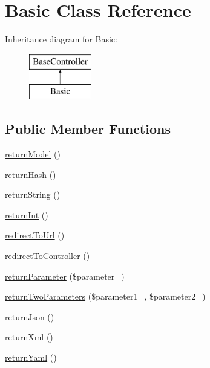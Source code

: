 \hypertarget{class_basic}{}\section{Basic Class Reference}
\label{class_basic}
Inheritance diagram for Basic\+:\begin{figure}[H]
\begin{center}
\leavevmode
\includegraphics[height=2.000000cm]{class_basic}
\end{center}
\end{figure}
\subsection*{Public Member Functions}
\begin{DoxyCompactItemize}
\item 
\hyperlink{class_basic_a7cb6a02987f0faaef2ee4aff9198907e}{return\+Model} ()
\item 
\hyperlink{class_basic_a16df2136bd66a75022f350d583e6c060}{return\+Hash} ()
\item 
\hyperlink{class_basic_a5bb666dcea19a9561c2047cfa25936bd}{return\+String} ()
\item 
\hyperlink{class_basic_a8d2918087022004ef5ad62d8f76a73d7}{return\+Int} ()
\item 
\hyperlink{class_basic_abf786273f796a96f5532dc60f9cec813}{redirect\+To\+Url} ()
\item 
\hyperlink{class_basic_a53f01fc4c43d1cecc497d9645f920407}{redirect\+To\+Controller} ()
\item 
\hyperlink{class_basic_ac380e8a432563c6affcfddd43384c1d2}{return\+Parameter} (\$parameter=\textquotesingle{}\textquotesingle{})
\item 
\hyperlink{class_basic_a2ef87b96abcca966a41e34d077fcc38e}{return\+Two\+Parameters} (\$parameter1=\textquotesingle{}\textquotesingle{}, \$parameter2=\textquotesingle{}\textquotesingle{})
\item 
\hyperlink{class_basic_aab9c1fc26dd9ab7939d5eb9e77c2c4a5}{return\+Json} ()
\item 
\hyperlink{class_basic_ab7183791265fc4aa7b57f81ed4cbf791}{return\+Xml} ()
\item 
\hyperlink{class_basic_a1728e20001f09f21fbf27251f3eeff52}{return\+Yaml} ()
\end{DoxyCompactItemize}
